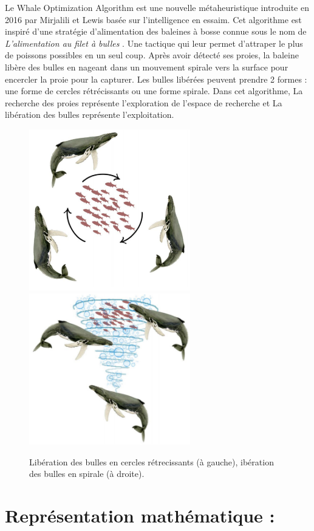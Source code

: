 \documentclass[12pt]{article}
\begin{document}
Le Whale Optimization Algorithm est une nouvelle métaheuristique introduite en 2016 par Mirjalili et Lewis basée sur l’intelligence en essaim. Cet algorithme est inspiré d’une stratégie d’alimentation des baleines à bosse connue sous le nom de \emph{L'alimentation au filet à bulles} . Une tactique qui leur permet d’attraper le plus de poissons possibles en un seul coup. Après avoir détecté ses proies, la baleine libère des bulles en nageant dans un mouvement spirale vers la surface pour encercler la proie pour la capturer.
Les bulles libérées peuvent prendre 2 formes : une forme de cercles rétrécissants ou une forme spirale. 
Dans cet algorithme, La recherche des proies représente l’exploration de l’espace de recherche et La libération des bulles représente l’exploitation.
\begin{figure}[hbt!] 
    \includegraphics[width=7cm]{../figures/WOA/cercles.png}
    \includegraphics[width=7cm]{../figures/WOA/spiral.png}
    \caption{Libération des bulles en cercles rétrecissants (à gauche), ibération des bulles en spirale (à droite).}
\end{figure}
\section{Représentation mathématique :}
\end{document}
